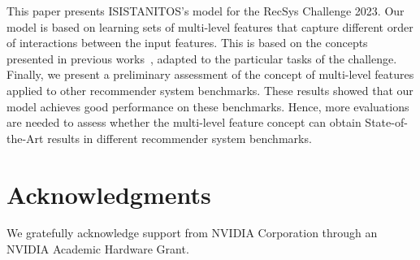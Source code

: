 \documentclass[manuscript,nonacm]{acmart}
\begin{document}
This paper presents ISISTANITOS's model for the RecSys Challenge 2023. 
Our model is based on learning sets of multi-level features that capture different order of interactions between the input features.
This is based on the concepts presented in previous works~\cite{wdlrs16, deepfm17}, adapted to the particular tasks of the challenge. Finally, we present a preliminary assessment of the concept of multi-level features applied to other recommender system benchmarks.
These results showed that our model achieves good performance on these benchmarks. Hence, more evaluations are needed to assess whether the multi-level feature concept can obtain State-of-the-Art results in different recommender system benchmarks.

\section*{Acknowledgments}
We gratefully acknowledge support from NVIDIA Corporation through an NVIDIA Academic Hardware Grant.




\end{document}
